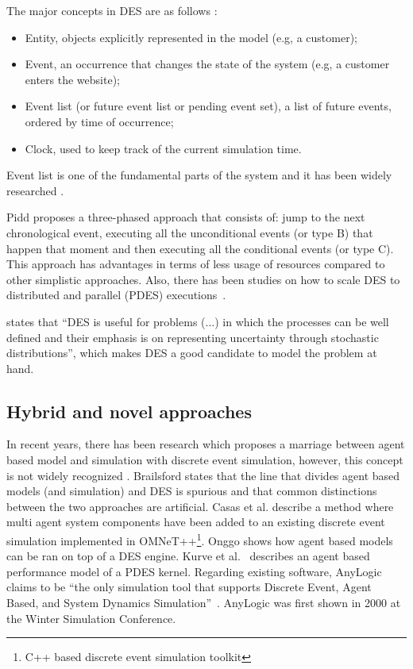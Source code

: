 The major concepts in DES are as follows \cite{Banks2004}:

\begin{itemize}
    \item Entity, objects explicitly represented in the model (e.g, a customer);
    \item Event, an occurrence that changes the state of the system (e.g, a  
    customer enters the website);
    \item Event list (or future event list or pending event set), a list of 
    future events, ordered by time of occurrence;
    \item Clock, used to keep track of the current simulation time.
\end{itemize}

Event list is one of the fundamental parts of the system and it has been widely 
researched \cite{Henriksen1986, Jones1986, Tan2000, Dickman2013}.

Pidd \cite{pidd1998computer} proposes a three-phased approach that consists of: 
jump to the next chronological event, executing all the unconditional events 
(or type B) that happen that moment and then executing all the conditional 
events (or type C). This approach has advantages in terms of less usage of 
resources compared to other simplistic approaches. Also, there has 
been studies on how to scale DES to distributed and parallel (PDES)
executions~\cite{Misra1986, Fujimoto1990}.

\cite{SiebersDES2010} states that ``DES is useful for problems (...) in which 
the processes can be well defined and their emphasis is on representing 
uncertainty through stochastic distributions'', which makes DES a good 
candidate to model the problem at hand.

\subsection{Hybrid and novel approaches}

In recent years, there has been research which proposes a marriage between 
agent based model and simulation with discrete event simulation, however, this 
concept is not widely recognized \cite{Brailsford2014}. Brailsford states that 
the line that divides agent based models (and simulation) and DES is spurious 
and that common distinctions between the two approaches are artificial. Casas 
et al. \cite{FonsecaiCasas2011} describe a method where multi agent system 
components have been added to an existing discrete event simulation implemented 
in OMNeT++\footnote{C++ based discrete event simulation 
    toolkit}\cite{Varga2001}. Onggo \cite{Onggo2007} shows how agent based 
    models 
can be ran on top of a DES engine. Kurve et al.~\cite{Kurve2013} describes an 
agent based performance model of a PDES kernel. Regarding existing software, 
AnyLogic claims to be ``the only simulation tool that supports Discrete Event, 
Agent Based, and System Dynamics Simulation''~\cite{AnyLogic2000}. AnyLogic was 
first shown in 2000 at the Winter Simulation Conference.

